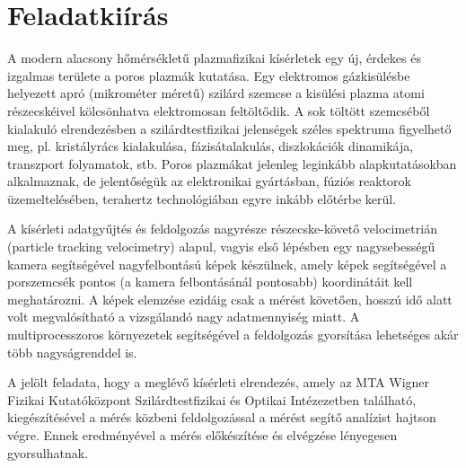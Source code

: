 \chapter*{Feladatkiírás}

A modern alacsony hőmérsékletű plazmafizikai kísérletek egy új, érdekes és izgalmas területe a poros plazmák
kutatása. Egy elektromos gázkisülésbe helyezett apró (mikrométer méretű) szilárd szemcse a kisülési plazma
atomi részecskéivel kölcsönhatva elektromosan feltöltődik. A sok töltött szemcséből kialakuló elrendezésben a
szilárdtestfizikai jelenségek széles spektruma figyelhető meg, pl. kristályrács kialakulása, fázisátalakulás,
diszlokációk dinamikája, transzport folyamatok, stb. Poros plazmákat jelenleg leginkább alapkutatásokban
alkalmaznak, de jelentőségük az elektronikai gyártásban, fúziós
reaktorok üzemeltelésében, {\color{red} terahertz}
technológiában egyre inkább előtérbe kerül.

A kísérleti adatgyűjtés és feldolgozás nagyrésze részecske-követő velocimetrián (particle tracking velocimetry)
alapul, vagyis első lépésben egy nagysebességű kamera segítségével nagyfelbontású képek készülnek, amely
képek segítségével a porszemcsék pontos (a kamera felbontásánál pontosabb) koordinátáit kell meghatározni. A
képek elemzése ezidáig csak a mérést követően, hosszú idő alatt volt megvalósítható a vizsgálandó nagy
adatmennyiség miatt. A multiprocesszoros környezetek segítségével a feldolgozás gyorsítása lehetséges akár
több nagyságrenddel is.

A jelölt feladata, hogy a meglévő kísérleti elrendezés, amely az MTA Wigner Fizikai Kutatóközpont
Szilárdtestfizikai és Optikai Intézezetben található, kiegészítésével a mérés közbeni feldolgozással a mérést
segítő analízist hajtson végre. Ennek eredményével a mérés előkészítése és elvégzése lényegesen gyorsulhatnak.

